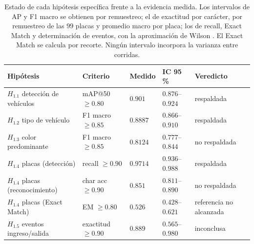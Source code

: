 \begin{table}[H]
    \centering
    \caption{Estado de cada hipótesis específica frente a la evidencia medida.
    Los intervalos de AP y F1 macro se obtienen por remuestreo; el de exactitud
    por carácter, por remuestreo de las $99$ placas y promedio macro por placa;
    los de recall, Exact Match y determinación de eventos, con la aproximación de
    Wilson \cite{wilson1927probable,brown2001interval}. El Exact Match se calcula
    por recorte. Ningún intervalo incorpora la varianza entre corridas.}
    \label{tab:contraste_hipotesis}
    \begin{tabularx}{\textwidth}{@{}>{\raggedright\arraybackslash}p{}
        >{\raggedright\arraybackslash}p{} l
        >{\raggedright\arraybackslash}p{}
        >{\raggedright\arraybackslash}X@{}}
        \toprule
        \textbf{Hipótesis} & \textbf{Criterio} & \textbf{Medido} &
        \textbf{IC 95\,\%} & \textbf{Veredicto} \\
        \midrule
        $H_{1{.}1}$ detección de vehículos & mAP@50 $\geq 0{.}80$ & $0{.}901$ & $0{.}876$--$0{.}924$ & respaldada \\
        $H_{1{.}2}$ tipo de vehículo       & F1 macro $\geq 0{.}85$ & $0{.}8887$ & $0{.}866$--$0{.}910$ & respaldada \\
        $H_{1{.}3}$ color predominante     & F1 macro $\geq 0{.}85$ & $0{.}8124$ & $0{.}777$--$0{.}844$ & no respaldada \\
        $H_{1{.}4}$ placas (detección)     & recall $\geq 0{.}90$ & $0{.}9714$ & $0{.}936$--$0{.}988$ & respaldada \\
        $H_{1{.}4}$ placas (reconocimiento) & char acc $\geq 0{.}90$ & $0{.}851$ & $0{.}811$--$0{.}890$ & no respaldada \\
        $H_{1{.}4}$ placas (Exact Match)   & EM $\geq 0{.}80$ & $0{.}526$ & $0{.}428$--$0{.}621$ & referencia no alcanzada \\
        $H_{1{.}5}$ eventos ingreso/salida & exactitud $\geq 0{.}90$ & $0{.}889$ & $0{.}565$--$0{.}980$ & inconclusa \\
        \bottomrule
    \end{tabularx}
\end{table}

